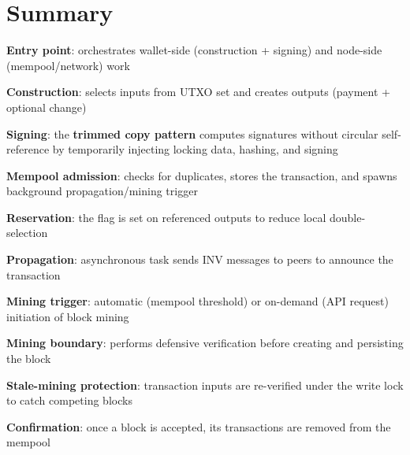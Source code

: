 \section{Summary}
\label{sec:ch09-5-summary}

\begin{chaptersummary}
\item \textbf{Entry point}:  orchestrates wallet-side (construction + signing) and node-side (mempool/network) work
\item \textbf{Construction}:  selects inputs from UTXO set and creates outputs (payment + optional change)
\item \textbf{Signing}: the \textbf{trimmed copy pattern} computes signatures without circular self-reference by temporarily injecting locking data, hashing, and signing
\item \textbf{Mempool admission}:  checks for duplicates, stores the transaction, and spawns background propagation/mining trigger
\item \textbf{Reservation}: the  flag is set on referenced outputs to reduce local double-selection
\item \textbf{Propagation}: asynchronous task sends INV messages to peers to announce the transaction
\item \textbf{Mining trigger}: automatic (mempool threshold) or on-demand (API request) initiation of block mining
\item \textbf{Mining boundary}:  performs defensive verification before creating and persisting the block
\item \textbf{Stale-mining protection}: transaction inputs are re-verified under the write lock to catch competing blocks
\item \textbf{Confirmation}: once a block is accepted, its transactions are removed from the mempool
\end{chaptersummary}